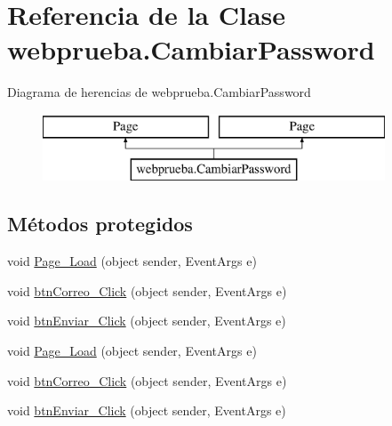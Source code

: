 \hypertarget{classwebprueba_1_1_cambiar_password}{}\section{Referencia de la Clase webprueba.\+Cambiar\+Password}
\label{classwebprueba_1_1_cambiar_password}
Diagrama de herencias de webprueba.\+Cambiar\+Password\begin{figure}[H]
\begin{center}
\leavevmode
\includegraphics[height=2.000000cm]{classwebprueba_1_1_cambiar_password}
\end{center}
\end{figure}
\subsection*{Métodos protegidos}
\begin{DoxyCompactItemize}
\item 
void \mbox{\hyperlink{classwebprueba_1_1_cambiar_password_a138bf721660479664b0de2f827ce5333}{Page\+\_\+\+Load}} (object sender, Event\+Args e)
\item 
void \mbox{\hyperlink{classwebprueba_1_1_cambiar_password_a763f5a890b60db92bb1e33dba70b9a11}{btn\+Correo\+\_\+\+Click}} (object sender, Event\+Args e)
\item 
void \mbox{\hyperlink{classwebprueba_1_1_cambiar_password_abaaa04899f2215cc960555112b9f13f1}{btn\+Enviar\+\_\+\+Click}} (object sender, Event\+Args e)
\item 
void \mbox{\hyperlink{classwebprueba_1_1_cambiar_password_a138bf721660479664b0de2f827ce5333}{Page\+\_\+\+Load}} (object sender, Event\+Args e)
\item 
void \mbox{\hyperlink{classwebprueba_1_1_cambiar_password_a763f5a890b60db92bb1e33dba70b9a11}{btn\+Correo\+\_\+\+Click}} (object sender, Event\+Args e)
\item 
void \mbox{\hyperlink{classwebprueba_1_1_cambiar_password_abaaa04899f2215cc960555112b9f13f1}{btn\+Enviar\+\_\+\+Click}} (object sender, Event\+Args e)
\end{DoxyCompactItemize}
